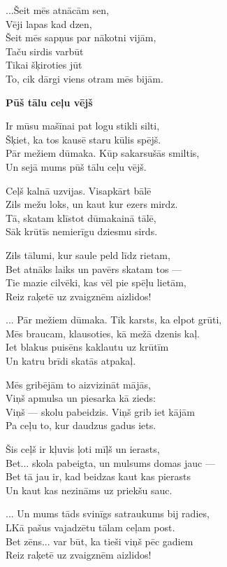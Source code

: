 \documentclass[11pt]{article}
\begin{document}
...Šeit mēs atnācām sen,\\
Vēji lapas kad dzen,\\
Šeit mēs sapņus par nākotni vijām,\\
Taču sirdis varbūt\\
Tikai šķiroties jūt\\
To, cik dārgi viens otram mēs bijām.


\newpage

{\bf Pūš tālu ceļu vējš}

Ir mūsu mašīnai pat logu stikli silti,\\
Šķiet, ka tos kausē staru kūlis spējš.\\
Pār mežiem dūmaka. Kūp sakarsušās smiltis,\\
Un sejā mums pūš tālu ceļu vējš.

Ceļš kalnā uzvijas. Visapkārt bālē\\
Zils mežu loks, un kaut kur ezers mirdz.\\
Tā, skatam klīstot dūmakainā tālē,\\
Sāk krūtīs nemierīgu dziesmu sirds.

Zils tālumi, kur saule peld līdz rietam,\\
Bet atnāks laiks un pavērs skatam tos ---\\
Tie mazie cilvēki, kas vēl pie spēļu lietām,\\
Reiz raķetē uz zvaigznēm aizlidos!

... Pār mežiem dūmaka. Tik karsts, ka elpot grūti,\\
Mēs braucam, klausoties, kā mežā dzenis kaļ.\\
Iet blakus puisēns kaklautu uz krūtīm\\
Un katru brīdi skatās atpakaļ.

Mēs gribējām to aizvizināt mājās,\\
Viņš apmulsa un piesarka kā zieds:\\
Viņš --- skolu pabeidzis. Viņš grib iet kājām\\
Pa ceļu to, kur daudzus gadus iets.

Šis ceļš ir kļuvis ļoti mīļš un ierasts,\\
Bet... skola pabeigta, un mulsums domas jauc ---\\
Bet tā jau ir, kad beidzas kaut kas pierasts\\
Un kaut kas nezināms uz priekšu sauc.

... Un mums tāds svinīgs satraukums bij radies,\\
LKā pašus vajadzētu tālam ceļam post.\\
Bet zēns... var būt, ka tieši viņš pēc gadiem\\
Reiz raķetē uz zvaigznēm aizlidos!
\end{document}
